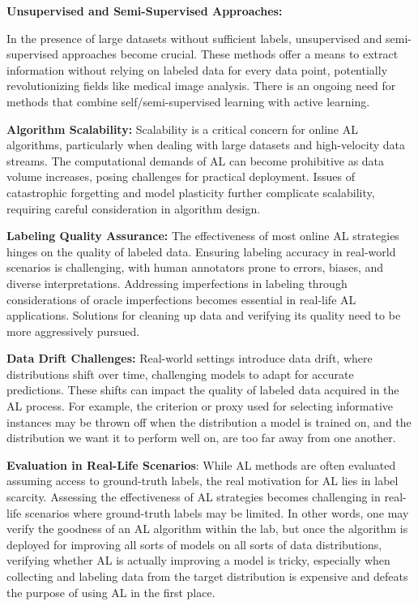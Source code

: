 \documentclass[
  letterpaper,
  numbers=noenddot,
  DIV=11]{scrreprt}
\theoremstyle{definition}
\theoremstyle{plain}
\theoremstyle{plain}
\theoremstyle{remark}
\begin{document}
\textbf{Unsupervised and Semi-Supervised Approaches:}

In the presence of large datasets without sufficient labels,
unsupervised and semi-supervised approaches become crucial. These
methods offer a means to extract information without relying on labeled
data for every data point, potentially revolutionizing fields like
medical image analysis. There is an ongoing need for methods that
combine self/semi-supervised learning with active learning.

\textbf{Algorithm Scalability:} Scalability is a critical concern for
online AL algorithms, particularly when dealing with large datasets and
high-velocity data streams. The computational demands of AL can become
prohibitive as data volume increases, posing challenges for practical
deployment. Issues of catastrophic forgetting and model plasticity
further complicate scalability, requiring careful consideration in
algorithm design.

\textbf{Labeling Quality Assurance:} The effectiveness of most online AL
strategies hinges on the quality of labeled data. Ensuring labeling
accuracy in real-world scenarios is challenging, with human annotators
prone to errors, biases, and diverse interpretations. Addressing
imperfections in labeling through considerations of oracle imperfections
becomes essential in real-life AL applications. Solutions for cleaning
up data and verifying its quality need to be more aggressively pursued.

\textbf{Data Drift Challenges:} Real-world settings introduce data
drift, where distributions shift over time, challenging models to adapt
for accurate predictions. These shifts can impact the quality of labeled
data acquired in the AL process. For example, the criterion or proxy
used for selecting informative instances may be thrown off when the
distribution a model is trained on, and the distribution we want it to
perform well on, are too far away from one another.

\textbf{Evaluation in Real-Life Scenarios}: While AL methods are often
evaluated assuming access to ground-truth labels, the real motivation
for AL lies in label scarcity. Assessing the effectiveness of AL
strategies becomes challenging in real-life scenarios where ground-truth
labels may be limited. In other words, one may verify the goodness of an
AL algorithm within the lab, but once the algorithm is deployed for
improving all sorts of models on all sorts of data distributions,
verifying whether AL is actually improving a model is tricky, especially
when collecting and labeling data from the target distribution is
expensive and defeats the purpose of using AL in the first place.
\end{document}
